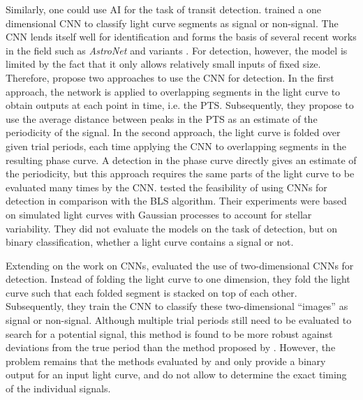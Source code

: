 Similarly, one could use AI for the task of transit detection. \cite{pearson2018searching} trained a one dimensional CNN to classify light curve segments as signal or non-signal. The CNN lends itself well for identification and forms the basis of several recent works in the field such as \textit{AstroNet} \citep{shallue2018identifying} and variants \citep{ansdell2018scientific, dattilo2019identifying, koning2019reducing, yu2019identifying, osborn2020rapid}. For detection, however, the model is limited by the fact that it only allows relatively small inputs of fixed size. Therefore, \cite{pearson2018searching} propose two approaches to use the CNN for detection. In the first approach, the network is applied to overlapping segments in the light curve to obtain outputs at each point in time, i.e. the PTS. Subsequently, they propose to use the average distance between peaks in the PTS as an estimate of the periodicity of the signal. In the second approach, the light curve is folded over given trial periods, each time applying the CNN to overlapping segments in the resulting phase curve. A detection in the phase curve directly gives an estimate of the periodicity, but this approach requires the same parts of the light curve to be evaluated many times by the CNN. \cite{zucker2018shallow} tested the feasibility of using CNNs for detection in comparison with the BLS algorithm. Their experiments were based on simulated light curves with Gaussian processes to account for stellar variability. They did not evaluate the models on the task of detection, but on binary classification, whether a light curve contains a signal or not.

Extending on the work on CNNs, \cite{chintarungruangchai2019detecting} evaluated the use of two-dimensional CNNs for detection. Instead of folding the light curve to one dimension, they fold the light curve such that each folded segment is stacked on top of each other. Subsequently, they train the CNN to classify these two-dimensional ``images'' as signal or non-signal. Although multiple trial periods still need to be evaluated to search for a potential signal, this method is found to be more robust against deviations from the true period than the method proposed by \cite{pearson2018searching}. However, the problem remains that the methods evaluated by \cite{chintarungruangchai2019detecting} and \cite{zucker2018shallow} only provide a binary output for an input light curve, and do not allow to determine the exact timing of the individual signals.